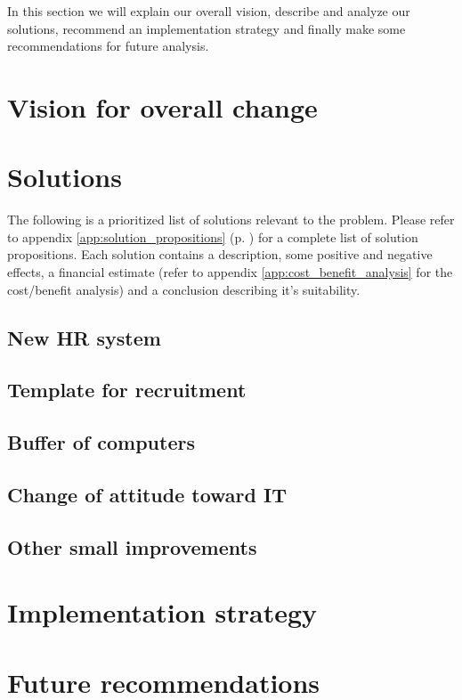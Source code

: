 In this section we will explain our overall vision, describe and analyze our solutions, recommend an implementation strategy and finally make some recommendations for future analysis.

\section{Vision for overall change}


\section{Solutions}
The following is a prioritized list of solutions relevant to the problem.
Please refer to appendix \ref{app:solution_propositions} (p. \pageref{app:solution_propositions}) for a complete list of solution propositions.
Each solution contains a description, some positive and negative effects, a financial estimate (refer to appendix \ref{app:cost_benefit_analysis} for the cost/benefit analysis) and a conclusion describing it's suitability.

\subsection{New HR system}

	
\subsection{Template for recruitment}


\subsection{Buffer of computers}


\subsection{Change of attitude toward IT}


\subsection{Other small improvements}


\section{Implementation strategy}


\section{Future recommendations}
